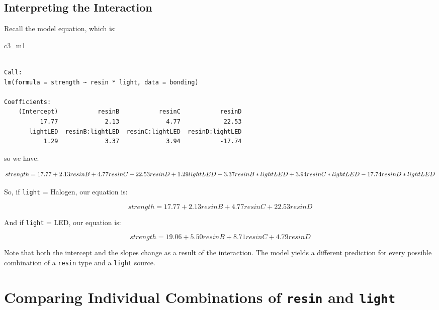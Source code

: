 \documentclass[]{book}
\newenvironment{Shaded}{\begin{snugshade}}{\end{snugshade}}
\newcommand{\NormalTok}[1]{#1}
\theoremstyle{definition}
\theoremstyle{definition}
\theoremstyle{definition}
\theoremstyle{remark}
\begin{document}
\subsection{Interpreting the
Interaction}\label{interpreting-the-interaction}

Recall the model equation, which is:

\begin{Shaded}
\begin{Highlighting}[]
\NormalTok{c3_m1}
\end{Highlighting}
\end{Shaded}

\begin{verbatim}

Call:
lm(formula = strength ~ resin * light, data = bonding)

Coefficients:
    (Intercept)           resinB           resinC           resinD  
          17.77             2.13             4.77            22.53  
       lightLED  resinB:lightLED  resinC:lightLED  resinD:lightLED  
           1.29             3.37             3.94           -17.74  
\end{verbatim}

so we have:

\[
strength = 17.77 + 2.13 resinB + 4.77 resinC + 22.53 resinD \\
+ 1.29 lightLED + 3.37 resinB*lightLED \\
+ 3.94 resinC*lightLED - 17.74 resinD*lightLED
\]

So, if \texttt{light} = Halogen, our equation is:

\[
strength = 17.77 + 2.13 resinB + 4.77 resinC + 22.53 resinD 
\]

And if \texttt{light} = LED, our equation is:

\[
strength = 19.06 + 5.50 resinB + 8.71 resinC + 4.79 resinD 
\]

Note that both the intercept and the slopes change as a result of the
interaction. The model yields a different prediction for every possible
combination of a \texttt{resin} type and a \texttt{light} source.

\section{\texorpdfstring{Comparing Individual Combinations of
\texttt{resin} and
\texttt{light}}{Comparing Individual Combinations of resin and light}}\label{comparing-individual-combinations-of-resin-and-light}
\end{document}

